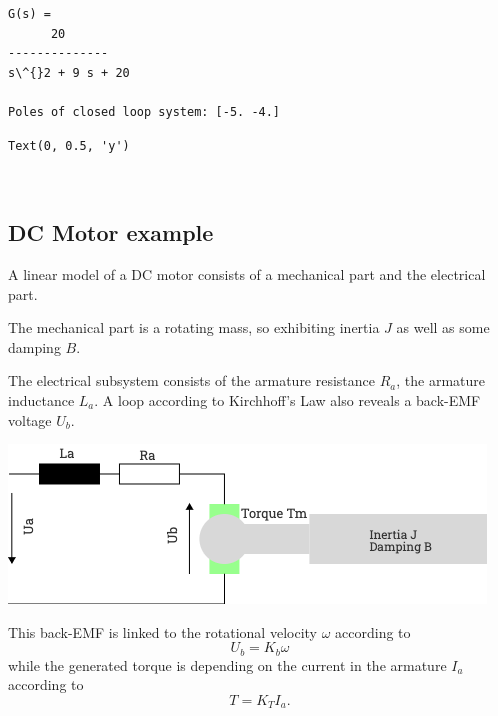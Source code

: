 \documentclass[11pt,a4paper, d]{scrartcl}
\makeatletter
\newcommand{\boxspacing}{\kern\kvtcb@left@rule\kern\kvtcb@boxsep}
\newcommand{\prompt}[4]{
        {\ttfamily\llap{{\color{#2}[#3]:\hspace{3pt}#4}}\vspace{-\baselineskip}}
    }
\makeatother
\begin{document}
    \begin{Verbatim}[commandchars=\\\{\}]
G(s) =
      20
--------------
s\^{}2 + 9 s + 20

Poles of closed loop system: [-5. -4.]
    \end{Verbatim}

            \begin{tcolorbox}[breakable, size=fbox, boxrule=.5pt, pad at break*=1mm, opacityfill=0]
\prompt{Out}{outcolor}{10}{\boxspacing}
\begin{Verbatim}[commandchars=\\\{\}]
Text(0, 0.5, 'y')
\end{Verbatim}
\end{tcolorbox}
        
    \begin{center}
    \end{center}
    { \hspace*{\fill} \\}
    
    \hypertarget{dc-motor-example}{%
\subsection{DC Motor example}\label{dc-motor-example}}

A linear model of a DC motor consists of a mechanical part and the
electrical part.

The mechanical part is a rotating mass, so exhibiting inertia \(J\) as
well as some damping \(B\).

The electrical subsystem consists of the armature resistance \(R_a\),
the armature inductance \(L_a\). A loop according to Kirchhoff's Law
also reveals a back-EMF voltage \(U_b\).

\includegraphics{figures/DCMotor.png}

This back-EMF is linked to the rotational velocity \(\omega\) according
to \[U_b = K_b \omega\] while the generated torque is depending on the
current in the armature \(I_a\) according to \[T = K_T I_a.\]
\end{document}
